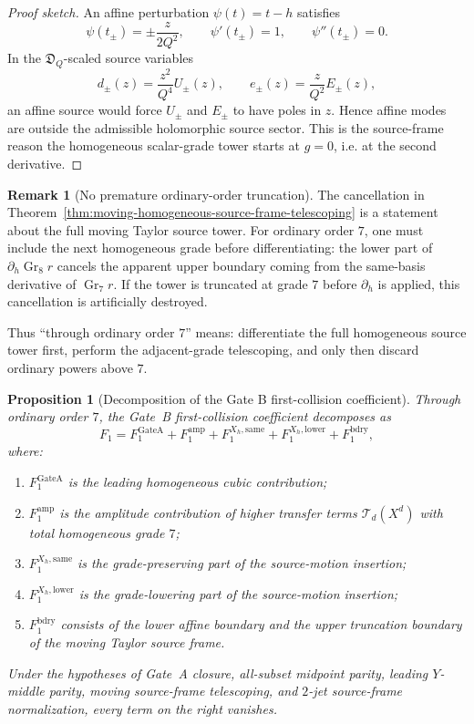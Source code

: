 \documentclass[11pt,a4paper]{amsart}
\theoremstyle{plain}
\newtheorem{proposition}[theorem]{Proposition}
\theoremstyle{definition}
\newtheorem{remark}[theorem]{Remark}
\begin{document}
\begin{proof}[Proof sketch]
An affine perturbation \(\psi(t)=t-h\) satisfies
\[
\psi(t_\pm)=\pm\frac{z}{2Q^2},\qquad
\psi'(t_\pm)=1,\qquad
\psi''(t_\pm)=0.
\]
In the \(\mathfrak D_Q\)-scaled source variables
\[
d_\pm(z)=\frac{z^2}{Q^4}U_\pm(z),
\qquad
e_\pm(z)=\frac{z}{Q^2}E_\pm(z),
\]
an affine source would force \(U_\pm\) and \(E_\pm\) to have poles in
\(z\).  Hence affine modes are outside the admissible holomorphic source
sector.  This is the source-frame reason the homogeneous scalar-grade
tower starts at \(g=0\), i.e. at the second derivative.
\end{proof}

\begin{remark}[No premature ordinary-order truncation]
\label{rem:no-premature-ordinary-order-truncation-gate-b}
The cancellation in
Theorem~\ref{thm:moving-homogeneous-source-frame-telescoping} is a statement
about the full moving Taylor source tower.  For ordinary order \(7\), one
must include the next homogeneous grade before differentiating: the lower
part of \(\partial_h\operatorname{Gr}_{8}r\) cancels the apparent upper
boundary coming from the same-basis derivative of
\(\operatorname{Gr}_{7}r\).  If the tower is truncated at grade \(7\) before
\(\partial_h\) is applied, this cancellation is artificially destroyed.

Thus ``through ordinary order \(7\)'' means: differentiate the full
homogeneous source tower first, perform the adjacent-grade telescoping, and
only then discard ordinary powers above \(7\).
\end{remark}

\begin{proposition}[Decomposition of the Gate B first-collision coefficient]
\label{prop:decomposition-gate-b-first-collision}
Through ordinary order \(7\), the Gate~B first-collision coefficient
decomposes as
\[
F_1
=
F_1^{\mathrm{GateA}}
+
F_1^{\mathrm{amp}}
+
F_1^{X_h,\mathrm{same}}
+
F_1^{X_h,\mathrm{lower}}
+
F_1^{\mathrm{bdry}},
\]
where:
\begin{enumerate}
\item \(F_1^{\mathrm{GateA}}\) is the leading homogeneous cubic
contribution;
\item \(F_1^{\mathrm{amp}}\) is the amplitude contribution of higher
transfer terms \(\mathcal T_d(X^d)\) with total homogeneous grade \(7\);
\item \(F_1^{X_h,\mathrm{same}}\) is the grade-preserving part of the
source-motion insertion;
\item \(F_1^{X_h,\mathrm{lower}}\) is the grade-lowering part of the
source-motion insertion;
\item \(F_1^{\mathrm{bdry}}\) consists of the lower affine boundary and
the upper truncation boundary of the moving Taylor source frame.
\end{enumerate}
Under the hypotheses of Gate~A closure, all-subset midpoint parity,
leading \(Y\)-middle parity, moving source-frame telescoping, and
\(2\)-jet source-frame normalization, every term on the right vanishes.
\end{proposition}
\end{document}
